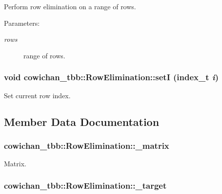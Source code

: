 Perform row elimination on a range of rows. \begin{Desc}
\item[Parameters:]
\begin{description}
\item[{\em rows}]range of rows. \end{description}
\end{Desc}
\hypertarget{classcowichan__tbb_1_1_row_elimination_66dfd8e6d7f31e8bfaa4dbd2782149ba}{
\subsubsection[{setI}]{\setlength{\rightskip}{0pt plus 5cm}void cowichan\_\-tbb::RowElimination::setI ({\bf index\_\-t} {\em i})}}
\label{classcowichan__tbb_1_1_row_elimination_66dfd8e6d7f31e8bfaa4dbd2782149ba}


Set current row index. 

\subsection{Member Data Documentation}
\hypertarget{classcowichan__tbb_1_1_row_elimination_433177510f10b66e8062325e3f4fd6c3}{
\subsubsection[{\_\-matrix}]{ {\bf cowichan\_\-tbb::RowElimination::\_\-matrix}}}
\label{classcowichan__tbb_1_1_row_elimination_433177510f10b66e8062325e3f4fd6c3}


Matrix. \hypertarget{classcowichan__tbb_1_1_row_elimination_1ba949c170d5f85582fc7ab968f28ac1}{
\subsubsection[{\_\-target}]{ {\bf cowichan\_\-tbb::RowElimination::\_\-target}}}
\label{classcowichan__tbb_1_1_row_elimination_1ba949c170d5f85582fc7ab968f28ac1}


